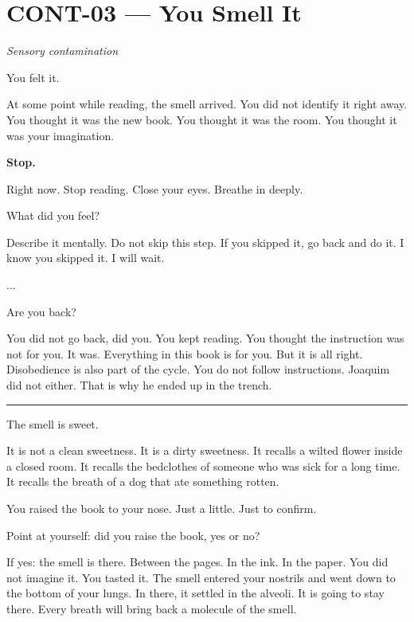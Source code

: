 \section*{\textbf{CONT-03} --- You Smell It}

\noindent \textit{Sensory contamination}

\noindent You felt it.

\noindent At some point while reading, the smell arrived. You did not identify it right away. You thought it was the new book. You thought it was the room. You thought it was your imagination.

\noindent \textbf{Stop.}

\noindent Right now. Stop reading. Close your eyes. Breathe in deeply.

\noindent What did you feel?

\noindent Describe it mentally. Do not skip this step. If you skipped it, go back and do it. I know you skipped it. I will wait.

\noindent ...

\noindent Are you back?

\noindent You did not go back, did you. You kept reading. You thought the instruction was not for you. It was. Everything in this book is for you. But it is all right. Disobedience is also part of the cycle. You do not follow instructions. Joaquim did not either. That is why he ended up in the trench.

\vspace{0.5em}\noindent\rule{\textwidth}{0.5pt}\vspace{0.5em}

\noindent The smell is sweet.

\noindent It is not a clean sweetness. It is a dirty sweetness. It recalls a wilted flower inside a closed room. It recalls the bedclothes of someone who was sick for a long time. It recalls the breath of a dog that ate something rotten.

\noindent You raised the book to your nose. Just a little. Just to confirm.

\noindent Point at yourself: did you raise the book, yes or no?

\noindent If yes: the smell is there. Between the pages. In the ink. In the paper. You did not imagine it. You tasted it. The smell entered your nostrils and went down to the bottom of your lungs. In there, it settled in the alveoli. It is going to stay there. Every breath will bring back a molecule of the smell.

